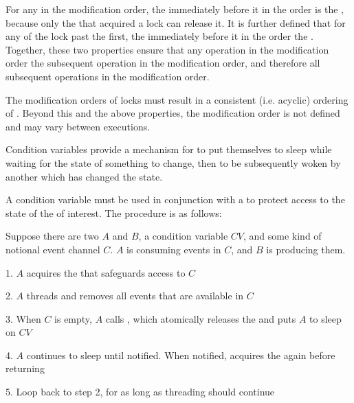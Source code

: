 For any  in the modification order, the  immediately before it in the order is
 the , because only the
 that acquired a lock can release it. It is further
defined that for any  of the lock past the
first, the  immediately before it in the order
 the . Together, these
two properties ensure that any operation in the modification order
 the subsequent operation in the modification
order, and therefore  all subsequent operations
in the modification order.

The modification orders of locks must result in a consistent
(i.e. acyclic)  ordering of
. Beyond this and the above properties, the
modification order is not defined and may vary between executions.

\endsubsubsection%

\endsubsection%


Condition variables provide a mechanism for  to put
themselves to sleep while waiting for the state of something to
change, then to be subsequently woken by another  which
has changed the state.

A condition variable must be used in conjunction with a  to
protect access to the state of the  of interest. The
procedure is as follows:

Suppose there are two  $A$ and $B$, a condition variable
$CV$, and some kind of notional event channel $C$. $A$ is consuming
events in $C$, and $B$ is producing them.

\beginlist
\item{1.} $A$ acquires the  that safeguards access to $C$
\item{2.} $A$ threads and removes all
  events that are available in $C$
\item{3.} When $C$ is empty, $A$ calls , which
  atomically releases the  and puts $A$ to sleep on $CV$
\item{4.} $A$ continues to sleep until notified. When notified,
   acquires the  again before
  returning
\item{5.} Loop back to step 2, for as long as threading should
  continue
\endlist

